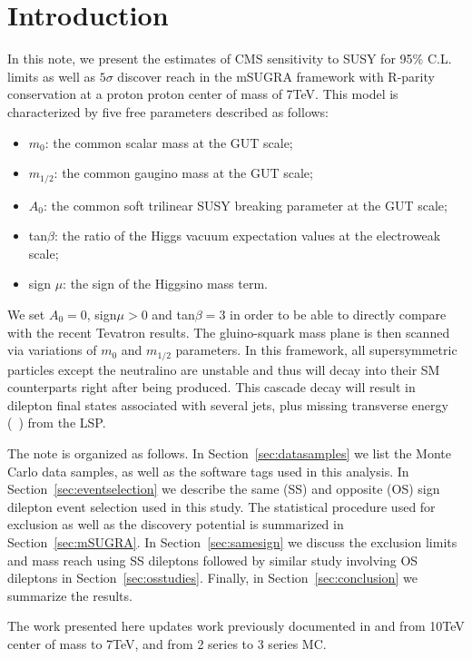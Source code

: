 \section{Introduction}
\label{sec:intro}

In this note, we present the estimates of CMS sensitivity to SUSY for 95\% C.L. limits as well as $5\sigma$ discover reach
in the mSUGRA framework with R-parity conservation at a proton proton center of mass of 7TeV. This model is characterized by five
free parameters described as follows:

\begin{itemize}
\item $m_{0}$: the common scalar mass at the GUT scale;
\item $m_{1/2}$: the common gaugino mass at the GUT scale;
\item $A_{0}$: the common soft trilinear SUSY breaking parameter at the GUT scale;
\item tan$\beta$: the ratio of the Higgs vacuum expectation values at the electroweak scale;
\item sign $\mu$: the sign of the Higgsino mass term.
\end{itemize}

 We set $A_{0} = 0$, sign$\mu > 0$ and tan$\beta = 3$ in order to be able to directly
compare with the recent Tevatron results\cite{cdf}\cite{dzero}. The gluino-squark mass plane is then scanned 
via variations of $m_{0}$ and $m_{1/2}$ parameters. In this framework, all supersymmetric particles
except the neutralino are unstable and thus will decay into their SM counterparts right
after being produced. This cascade decay will result in dilepton final states associated 
with several jets, plus missing transverse energy (\met~) from the LSP.

The note is organized as follows. In Section~\ref{sec:datasamples} we list the Monte Carlo data samples, as well as the 
software tags used in this analysis. In Section~\ref{sec:eventselection} we describe the same (SS) and opposite (OS) sign 
dilepton event selection used in this study. The statistical procedure used for exclusion as well as 
the discovery potential is summarized in Section~\ref{sec:mSUGRA}. In Section~\ref{sec:samesign} we discuss the exclusion limits and
mass reach using SS dileptons followed by similar study involving OS dileptons in Section~\ref{sec:osstudies}. Finally, in 
Section~\ref{sec:conclusion} we summarize the results.

The work presented here updates work previously documented in\cite{osnote} and \cite{ssnote} from 10TeV center of mass to 7TeV,
and from 2 series to 3 series MC.
 
 



